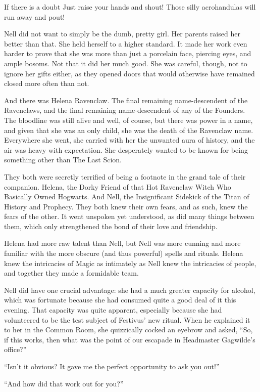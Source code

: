 If there is a doubt
Just raise your hands and shout!
Those silly acrohandulas
will run away and pout!

Nell did not want to simply be the dumb, pretty girl. Her parents raised her better than that. She held herself to a higher standard. It made her work even harder to prove that she was more than just a porcelain face, piercing eyes, and ample bosoms. Not that it did her much good. She was careful, though, not to ignore her gifts either, as they opened doors that would otherwise have remained closed more often than not.

And there was Helena Ravenclaw. The final remaining name-descendent of the Ravenclaws, and the final remaining name-descendent of any of the Founders. The bloodline was still alive and well, of course, but there was power in a name, and given that she was an only child, she was the death of the Ravenclaw name. Everywhere she went, she carried with her the unwanted aura of history, and the air was heavy with expectation. She desperately wanted to be known for being something other than The Last Scion.

They both were secretly terrified of being a footnote in the grand tale of their companion. Helena, the Dorky Friend of that Hot Ravenclaw Witch Who Basically Owned Hogwarts. And Nell, the Insignificant Sidekick of the Titan of History and Prophecy. They both knew their own fears, and as such, knew the fears of the other. It went unspoken yet understood, as did many things between them, which only strengthened the bond of their love and friendship.

Helena had more raw talent than Nell, but Nell was more cunning and more familiar with the more obscure (and thus powerful) spells and rituals. Helena knew the intricacies of Magic as intimately as Nell knew the intricacies of people, and together they made a formidable team.

Nell did have one crucial advantage: she had a much greater capacity for alcohol, which was fortunate because she had consumed quite a good deal of it this evening. That capacity was quite apparent, especially because she had volunteered to be the test subject of Festivus’ new ritual. When he explained it to her in the Common Room, she quizzically cocked an eyebrow and asked, “So, if this works, then what was the point of our escapade in Headmaster Gagwilde’s office?”

“Isn’t it obvious? It gave me the perfect opportunity to ask you out!”

“And how did that work out for you?”

